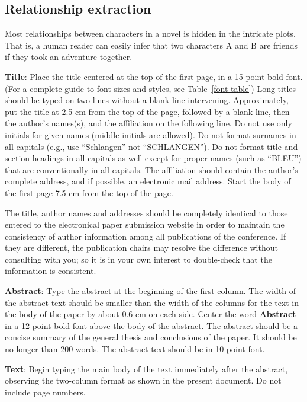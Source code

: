 \documentclass[11pt]{article}
\begin{document}
\subsection{Relationship extraction} %
\label{ssec:first}

Most relationships between characters in a novel is hidden in the intricate plots. That is, a human reader can easily infer that two characters A and B are friends if they took an adventure together.

{\bf Title}: Place the title centered at the top of the first page, in
a 15-point bold font. (For a complete guide to font sizes and styles,
see Table~\ref{font-table}) Long titles should be typed on two lines
without a blank line intervening. Approximately, put the title at 2.5
cm from the top of the page, followed by a blank line, then the
author's names(s), and the affiliation on the following line. Do not
use only initials for given names (middle initials are allowed). Do
not format surnames in all capitals (e.g., use ``Schlangen'' not
``SCHLANGEN'').  Do not format title and section headings in all
capitals as well except for proper names (such as ``BLEU'') that are
conventionally in all capitals.  The affiliation should contain the
author's complete address, and if possible, an electronic mail
address. Start the body of the first page 7.5 cm from the top of the
page.

The title, author names and addresses should be completely identical
to those entered to the electronical paper submission website in order
to maintain the consistency of author information among all
publications of the conference. If they are different, the publication
chairs may resolve the difference without consulting with you; so it
is in your own interest to double-check that the information is
consistent.

{\bf Abstract}: Type the abstract at the beginning of the first
column. The width of the abstract text should be smaller than the
width of the columns for the text in the body of the paper by about
0.6 cm on each side. Center the word {\bf Abstract} in a 12 point bold
font above the body of the abstract. The abstract should be a concise
summary of the general thesis and conclusions of the paper. It should
be no longer than 200 words. The abstract text should be in 10 point font.

{\bf Text}: Begin typing the main body of the text immediately after
the abstract, observing the two-column format as shown in 
the present document. Do not include page numbers.
\end{document}
